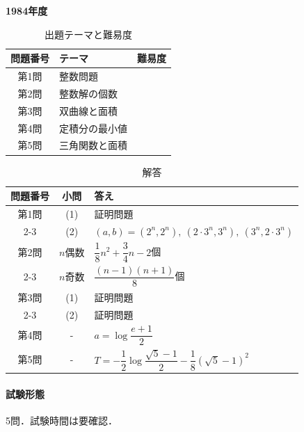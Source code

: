 \documentclass[../../main.tex]{subfiles}
\begin{document}
\begin{center}
  {\fontsize{48pt}{58pt}\selectfont \textbf{1984}\normalsize\textbf{年度}}
\end{center}

\begin{table}[htb]
  \centering
  \caption{出題テーマと難易度}
  \begin{tabular}{|c|p{9cm}|c|}
    \hline
    \textbf{問題番号} & \textbf{テーマ} & \textbf{難易度} \\
    \hline
    第1問 & 整数問題 & \\
    \hline
    第2問 & 整数解の個数 & \\
    \hline
    第3問 & 双曲線と面積 & \\
    \hline
    第4問 & 定積分の最小値 & \\
    \hline
    第5問 & 三角関数と面積 & \\
    \hline
  \end{tabular}
\end{table}

\begin{table}[htb]
  \centering
  \caption{解答}
  \renewcommand{\arraystretch}{1.4}
  \begin{tabular}{|c|c|p{9cm}|}
    \hline
    \textbf{問題番号} & \textbf{小問} & \textbf{答え} \\
    \hline
    第1問 & (1) & 証明問題 \\
    \cline{2-3}
    & (2) & $(a,b)=(2^n,2^n),\ (2\cdot3^n,3^n),\ (3^n,2\cdot3^n)$ \\
    \hline
    第2問 & $n$偶数 & $\dfrac{1}{8}n^2+\dfrac{3}{4}n-2$個 \\
    \cline{2-3}
    & $n$奇数 & $\dfrac{(n-1)(n+1)}{8}$個 \\
    \hline
    第3問 & (1) & 証明問題 \\
    \cline{2-3}
    & (2) & 証明問題 \\
    \hline
    第4問 & - & $a=\log\dfrac{e+1}{2}$ \\
    \hline
    第5問 & - & $T=-\dfrac{1}{2}\log\dfrac{\sqrt{5}-1}{2}-\dfrac{1}{8}(\sqrt{5}-1)^2$ \\
    \hline
  \end{tabular}
\end{table}

\paragraph{試験形態}
5問．試験時間は要確認．
\end{document}
